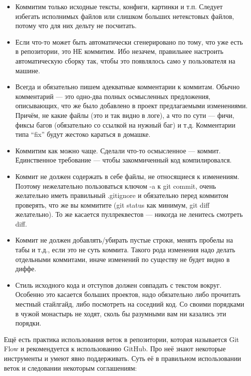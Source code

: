 \documentclass[a5paper]{article}
\begin{document}
\begin{itemize}
	\item Коммитим только исходные тексты, конфиги, картинки и т.п. Следует избегать исполнимых файлов или слишком больших нетекстовых файлов, потому что для них дельту не посчитать.
	\item Если что-то может быть автоматически сгенерировано по тому, что уже есть в репозитории, это НЕ коммитим. Ибо незачем, правильнее настроить автоматическую сборку так, чтобы это появлялось само у пользователя на машине.
	\item Всегда и обязательно пишем адекватные комментарии к коммитам. Обычно комментарий --- это одно-два полных осмысленных предложения, описывающих, что же было добавлено в проект предлагаемыми изменениями. Причём, не какие файлы (это и так видно в логе), а что по сути --- фичи, фиксы багов (обязательно со ссылкой на нужный баг) и т.д. Комментарии типа ``fix'' будут жестоко караться в домашке.
	\item Коммитим как можно чаще. Сделали что-то осмысленное --- коммит. Единственное требование --- чтобы закоммиченный код компилировался.
	\item Коммит не должен содержать в себе файлы, не относящиеся к изменениям. Поэтому нежелательно пользоваться ключом -a к git commit, очень желательно иметь правильный .gitignore и обязательно перед коммитом проверять, что же вы коммитите (git status как минимум, git diff желательно). То же касается пуллреквестов --- никогда не ленитесь смотреть diff.
	\item Коммит не должен добавлять/убирать пустые строки, менять пробелы на табы и т.д., если это не суть коммита. Такого рода изменения надо делать отдельными коммитами, иначе изменений по существу не будет видно в диффе.
	\item Стиль исходного кода и отступов должен совпадать с текстом вокруг. Особенно это касается больших проектов, надо обязательно либо прочитать местный стайлгайд, либо посмотреть на соседний код. Со своими порядками в чужой монастырь не ходят, сколь бы разумными вам ни казались эти порядки.
\end{itemize}

Ещё есть практика использования веток в репозитории, которая называется Git Flow и рекомендуется к использованию GitHub. Про неё знают некоторые инструменты и умеют явно поддерживать. Суть её в правильном использовании веток и следовании некоторым соглашениям:
\end{document}
